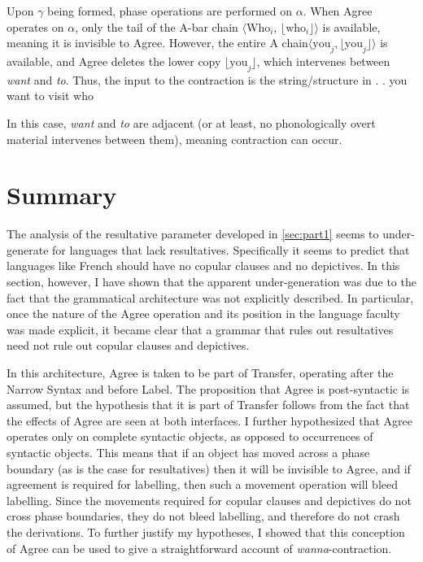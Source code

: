 \documentclass[MilwayThesis]{subfiles}
\begin{document}
Upon $\gamma$ being formed, phase operations are performed on $\alpha$.
When Agree operates on $\alpha$, only the tail of the A-bar chain $\langle$Who$_i$, $\lfloor\text{who}_{i}\rfloor\rangle$ is available, meaning it is invisible to Agree.
However, the entire A chain$\langle\text{you}_{j}, \lfloor\text{you}_{j}\rfloor\rangle$ is available, and Agree deletes the lower copy $\lfloor\text{you}_{j}\rfloor$, which intervenes between \textit{want} and \textit{to}.
Thus, the input to the contraction is the string/structure in \Next.
\ex. you want to visit who

In this case, \textit{want} and \textit{to} are adjacent (or at least, no phonologically overt material intervenes between them), meaning contraction can occur.

\section{Summary}
The analysis of the resultative parameter developed in \cref{sec:part1} seems to under-generate for languages that lack resultatives.
Specifically it seems to predict that languages like French should have no copular clauses and no depictives.
In this section, however, I have shown that the apparent under-generation was due to the fact that the grammatical architecture was not explicitly described.
In particular, once the nature of the Agree operation and its position in the language faculty was made explicit, it became clear that a grammar that rules out resultatives need not rule out copular clauses and depictives.

In this architecture, Agree is taken to be part of Transfer, operating after the Narrow Syntax and before Label.
The proposition that Agree is post-syntactic is assumed, but the hypothesis that it is part of Transfer follows from the fact that the effects of Agree are seen at both interfaces.
I further hypothesized that Agree operates only on complete syntactic objects, as opposed to occurrences of syntactic objects.
This means that if an object has moved across a phase boundary (as is the case for resultatives) then it will be invisible to Agree, and if agreement is required for labelling, then such a movement operation will bleed labelling.
Since the movements required for copular clauses and depictives do not cross phase boundaries, they do not bleed labelling, and therefore do not crash the derivations.
To further justify my hypotheses, I showed that this conception of Agree can be used to give a straightforward account of \textit{wanna}-contraction.
\end{document}

